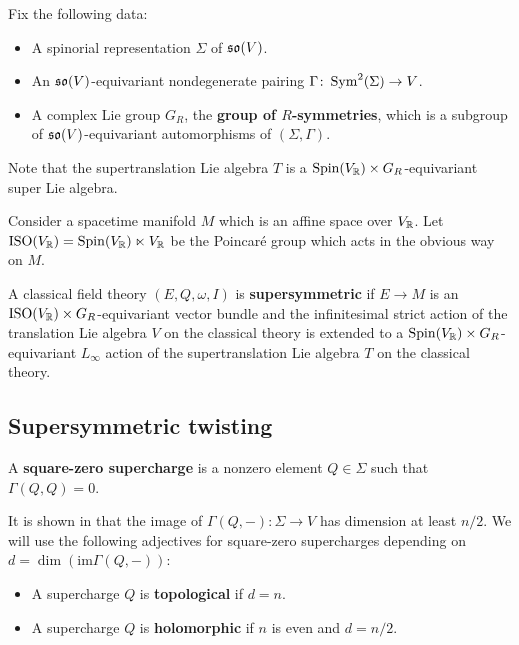 \documentclass[10pt, oneside]{article}
\begin{document}
Fix the following data:
\begin{itemize}
\item A spinorial representation $\Sigma$ of $\mathfrak{so}(V)$.

\item An $\mathfrak{so}(V)$-equivariant nondegenerate pairing $\Gamma\colon \operatorname{Sym}^2(\Sigma)\rightarrow V$.

\item A complex Lie group $G_R$, the {\bf group of $R$-symmetries}, which is a subgroup of $\mathfrak{so}(V)$-equivariant automorphisms of $(\Sigma, \Gamma)$.
\end{itemize}

Note that the supertranslation Lie algebra $T$ is a $\mathrm{Spin}(V_\mathbb R)\times G_R$-equivariant super Lie algebra.

Consider a spacetime manifold $M$ which is an affine space over $V_\mathbb R$. Let $\mathrm{ISO}(V_\mathbb R) = \mathrm{Spin}(V_\mathbb R)\ltimes V_\mathbb R$ be the Poincar\'{e} group which acts in the obvious way on $M$.

\begin{dfn}
A classical field theory $(E, Q, \omega, I)$ is {\bf supersymmetric} if $E\rightarrow M$ is an $\mathrm{ISO}(V_\mathbb R)\times G_R$-equivariant vector bundle and the infinitesimal strict action of the translation Lie algebra $V$ on the classical theory is extended to a $\mathrm{Spin}(V_\mathbb R)\times G_R$-equivariant $L_\infty$ action of the supertranslation Lie algebra $T$ on the classical theory.
\end{dfn}

\subsection{Supersymmetric twisting}

\begin{dfn}
A {\bf square-zero supercharge} is a nonzero element $Q\in\Sigma$ such that $\Gamma(Q, Q)=0$.
\end{dfn}

It is shown in \cite[Proposition 3.25]{ElliottSafronov} that the image of $\Gamma(Q, -)\colon \Sigma\rightarrow V$ has dimension at least $n/2$. We will use the following adjectives for square-zero supercharges depending on $d=\dim(\mathrm{im}\Gamma(Q, -))$:
\begin{itemize}
\item A supercharge $Q$ is {\bf topological} if $d = n$.

\item A supercharge $Q$ is {\bf holomorphic} if $n$ is even and $d=n/2$.
\end{itemize}
\end{document}
